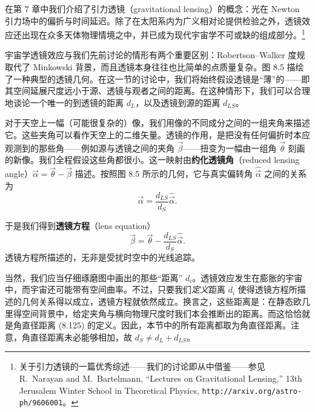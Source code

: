 在第 7 章中我们介绍了引力透镜（gravitational lensing）的概念：光在 Newton 引力场中的偏折与时间延迟。除了在太阳系内为广义相对论提供检验之外，透镜效应还出现在众多天体物理情境之中，并已成为现代宇宙学不可或缺的组成部分。\footnote{关于引力透镜的一篇优秀综述——我们的讨论即从中借鉴——参见 R.~Narayan and M.~Bartelmann, ``Lectures on Gravitational Lensing,'' 13th Jerusalem Winter School in Theoretical Physics, \texttt{http://arxiv.org/astro-ph/9606001}。}


宇宙学透镜效应与我们先前讨论的情形有两个重要区别：Robertson--Walker 度规取代了 Minkowski 背景，而且透镜本身往往也比简单的点质量复杂。图 8.5 描绘了一种典型的透镜几何。在这一节的讨论中，我们将始终假设透镜是“薄”的——即其空间延展尺度远小于源、透镜与观者之间的距离。在这种情形下，我们可以合理地谈论一个唯一的到透镜的距离 $d_L$，以及透镜到源的距离 $d_{LS}$。

对于天空上一幅（可能很复杂的）像，我们用像的不同成分之间的一组夹角来描述它。这些夹角可以看作天空上的二维矢量。透镜的作用，是把没有任何偏折时本应观测到的那些角——例如源与透镜之间的夹角 $\vec{\beta}$——扭变为一幅由一组角 $\vec{\theta}$ 刻画的新像。我们全程假设这些角都很小。这一映射由\textbf{约化透镜角}（reduced lensing angle）$\vec{\alpha}=\vec{\theta}-\vec{\beta}$ 描述。按照图 8.5 所示的几何，它与真实偏转角 $\widehat{\vec{\alpha}}$ 之间的关系为
\begin{equation*}
\vec{\alpha} = \frac{d_{LS}}{d_S}\widehat{\vec{\alpha}}.
\tag{8.131}
\end{equation*}

于是我们得到\textbf{透镜方程}（lens equation）
\begin{equation*}
\boxed{\,\vec{\beta} = \vec{\theta} - \frac{d_{LS}}{d_S}\widehat{\vec{\alpha}}.\,}
\tag{8.132}
\end{equation*}
透镜方程所描述的，无非是受扰时空中的光线追踪。

当然，我们应当仔细琢磨图中画出的那些“距离” $d_i$。透镜效应发生在膨胀的宇宙中，而宇宙还可能带有空间曲率。不过，只要我们\emph{定义}距离 $d_i$ 使得透镜方程所描述的几何关系得以成立，透镜方程就依然成立。换言之，这些距离是：在静态欧几里得空间背景中，给定夹角与横向物理尺度时我们本会推断出的距离。而这恰恰就是角直径距离 (8.125) 的定义。因此，本节中的所有距离都取为角直径距离。注意，角直径距离未必能够相加，故 $d_S\neq d_L+d_{LS}$。

